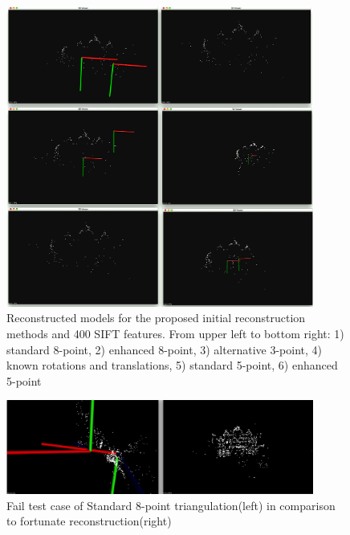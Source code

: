 \begin{figure}[t!]
    \centering
    \includegraphics[width=0.9\textwidth]{uni400Comparison}
    \caption[Reconstructed models for the proposed initial reconstruction methods and 400 SIFT features]{Reconstructed models for the proposed initial reconstruction methods and 400 SIFT features. From upper left to bottom right: 1) standard 8-point, 2) enhanced 8-point, 3) alternative 3-point, 4) known rotations and translations, 5) standard 5-point, 6) enhanced 5-point}
    \label{fig:uni400Comparison}
\end{figure}
\begin{figure}[p]
    \centering
    \includegraphics[width=0.9\textwidth]{FailCaseFundamental}
    \caption[Fail test case of Standard 8-point triangulation in comparison to fortunate reconstruction]{Fail test case of Standard 8-point triangulation(left) in comparison to fortunate reconstruction(right)}
    \label{fig:FailCaseFundamental}
\end{figure}

